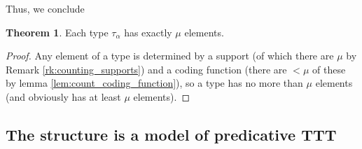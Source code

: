 \documentclass[112pt]{article}
\theoremstyle{definition}
\newtheorem{theorem}{Theorem}[section]
\theoremstyle{remark}
\begin{document}
{Thus, we conclude}
\begin{theorem}\label{thm:count_elements}
{Each type $\tau_\alpha$ has exactly $\mu$ elements.}
\end{theorem}
\begin{proof}
Any element of a type is determined by a support (of which there are $\mu$ {by Remark \ref{rk:counting_supports}}) and a coding function (there are $<\mu$ of these {by lemma \ref{lem:count_coding_function}}), so a type has no more than $\mu$ elements (and obviously has at least $\mu$ elements).
\end{proof}

\newpage
\subsection{The structure is a model of predicative TTT}\label{ss:predicative_ttt}
\end{document}
